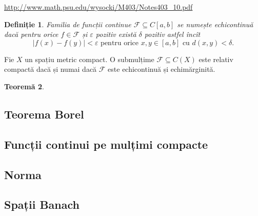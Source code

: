\documentclass[a4paper,12pt]{article}
\theoremstyle{change}
\newtheorem{theorem}{Teoremă}[section]
\newtheorem{definition}[theorem]{Definiție}
\begin{document}
\url{http://www.math.psu.edu/wysocki/M403/Notes403_10.pdf}

\begin{definition}
Familia de funcții continue $\mathcal{F}\subseteq C[a,b]$ se numește \emph{echicontinuă} dacă pentru orice $f\in \mathcal{F}$ și  $\varepsilon$ pozitiv există $\delta$ pozitiv astfel încît
\[
|f(x)-f(y)|<\varepsilon\text{ pentru orice }x,y\in[a,b]\text{ cu }d(x,y)<\delta. 
\]
\end{definition}
Fie $X$ un spațiu metric compact. O submulțime $\mathcal{F}\subseteq C(X)$ este relativ compactă dacă și numai dacă $\mathcal{F}$ este echicontinuă și echimărginită.
\begin{theorem}

\end{theorem}

\subsection{Teorema Borel}

\subsection{Funcții continui pe mulțimi compacte}


\subsection{Norma}


\subsection{Spații Banach}
\end{document}
